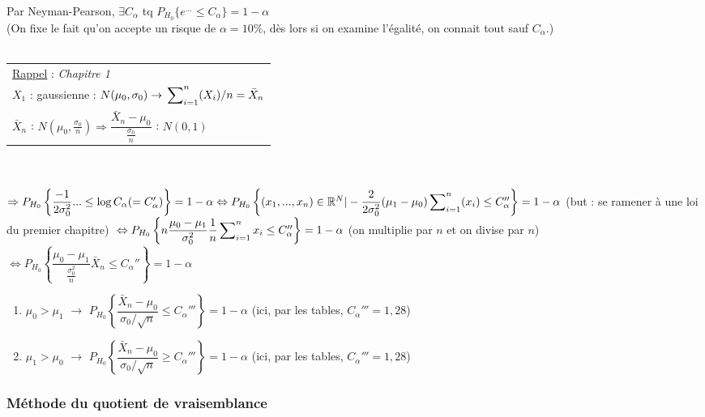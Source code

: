\documentclass{article}
\newcommand{\R}{\mathbb{R}}
\newcommand{\sumin}{\sideset{}{_{i=1}^n}\sum}
\begin{document}
Par Neyman-Pearson, $\exists C_\alpha$ tq $P_{H_0}\{ e^{...} \leq C_\alpha\} = 1-\alpha$ \\
(On fixe le fait qu'on accepte un risque de $\alpha = 10\%$, dès lors si on examine l'égalité, on connait tout sauf $C_\alpha$.)\\
$ $ \\

\begin{tabular}{l}
\hline
\noindent\underline{Rappel} : \textit{Chapitre 1}\\ 
$X_1$ : gaussienne : $N(\mu_0,\sigma_0) \rightarrow \sumin (X_i)/n = \bar{X}_n$ \\
$\bar{X}_n$ : $N(\mu_0,\frac{\sigma_0}{n}) \Rightarrow \dfrac{\bar{X}_n-\mu_0}{\frac{\sigma_0}{n}}$ : $N(0,1)$ \\
\hline
\end{tabular} \\

$ $ \\

\noindent $\Rightarrow P_{H_0} \left\{ \dfrac{-1}{2\sigma_0^2} ... \leq \log C_\alpha (=C_\alpha') \right\} = 1-\alpha\\
\Leftrightarrow P_{H_0} \left\{ (x_1,...,x_n) \in \R^N | - \dfrac{2}{2\sigma_0^2} 
(\mu_1 -\mu_0) \sumin (x_i) \leq C_\alpha '' \right\} = 1-\alpha$ (but : se ramener à une loi du premier chapitre) $ \\
\Leftrightarrow P_{H_0} \left\{ n \dfrac{\mu_0 - \mu_1}{\sigma_0^2} \dfrac{1}{n} \sumin x_i \leq C_\alpha'' \right\} = 1-\alpha$
(on multiplie par $n$ et on divise par $n$) \\ $
\Leftrightarrow P_{H_0} \left\{ \dfrac{\mu_0 - \mu_1}{\frac{\sigma_0^2}{n}} \bar{X}_n \leq C_\alpha'' \right\} = 1-\alpha$
\begin{enumerate}
\item \underline{$\mu_0>\mu_1$} $\rightarrow$ $P_{H_0} \left\{ \dfrac{\bar{X}_n - \mu_0}{\sigma_0/\sqrt{n}} \leq 
C_\alpha'''\right\} = 1-\alpha$ (ici, par les tables, $C_\alpha''' = 1,28$) \\

\item \underline{$\mu_1>\mu_0$} $\rightarrow$ $P_{H_0} \left\{ \dfrac{\bar{X}_n - \mu_0}{\sigma_0/\sqrt{n}} \geq 
C_\alpha'''\right\} = 1-\alpha$ (ici, par les tables, $C_\alpha''' = 1,28$) \\

\end{enumerate}

\subsubsection{Méthode du quotient de vraisemblance}
\end{document}

